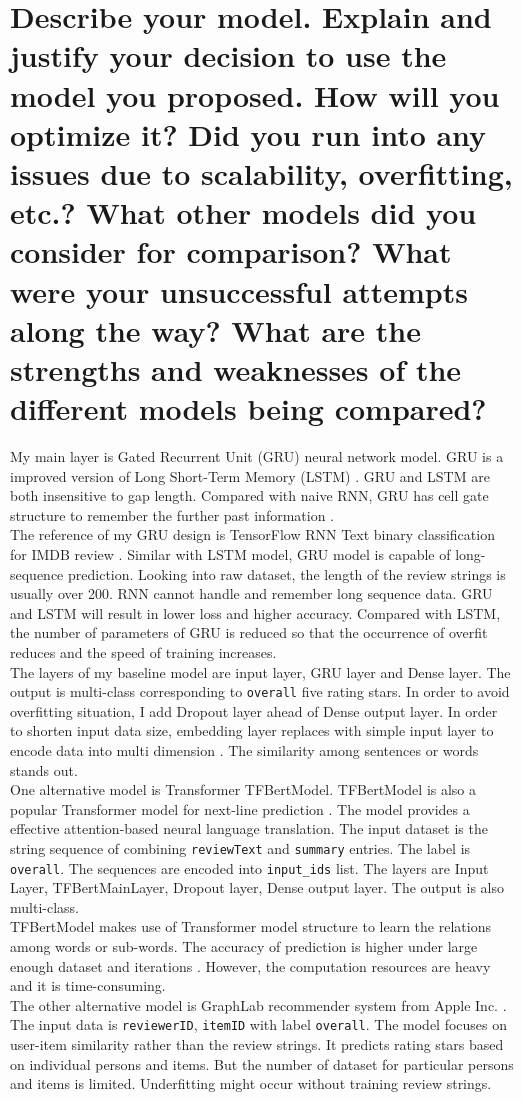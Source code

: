 \documentclass[12pt]{article}
\begin{document}
\section{Describe your model. Explain and justify your decision to use the model you proposed. How
will you optimize it? Did you run into any issues due to scalability, overfitting, etc.? What
other models did you consider for comparison? What were your unsuccessful attempts along
the way? What are the strengths and weaknesses of the different models being compared?} 
My main layer is Gated Recurrent Unit (GRU) neural network model.
GRU is a improved version of Long Short-Term Memory (LSTM) \cite{gru}. GRU and LSTM are both insensitive 
to gap length. Compared with naive RNN, GRU has cell gate structure to remember the further past information \cite{lstm}.\\
The reference of my GRU design is
TensorFlow RNN Text binary classification for IMDB review \cite{Textclassification}. Similar with LSTM model, GRU
model is capable of long-sequence prediction. Looking into raw dataset, the length of the review strings
is usually over 200. RNN cannot handle and remember long sequence data. GRU and LSTM will result in lower loss and 
higher accuracy.
Compared with LSTM, the number of parameters of GRU is reduced so
that the occurrence of overfit reduces and the speed of training increases.\\
The layers of my baseline model are input layer, GRU layer and Dense layer. The output is multi-class corresponding to \texttt{overall} five rating stars. In order to avoid overfitting situation, I add Dropout layer ahead of Dense output layer. In order to shorten input data size, embedding layer replaces with simple input layer to encode data into
multi dimension \cite{emd}. The similarity among sentences or words stands out.\\
One alternative model is Transformer TFBertModel.
TFBertModel is also a popular Transformer model for next-line prediction \cite{BERT, trans}. 
The model provides a effective attention-based neural language translation.
The input dataset is the string
sequence of combining \texttt{reviewText} and \texttt{summary} entries. The label is \texttt{overall}. The sequences are
encoded into \texttt{input\_ids} list. The layers are Input Layer, TFBertMainLayer, Dropout layer, Dense output
layer. The output is also multi-class.\\
TFBertModel makes use of Transformer model structure to learn the relations among words or sub-words.
The accuracy of prediction is higher under large enough dataset and iterations \cite{BERTpros}. 
However, the computation resources are heavy and it is time-consuming.\\
The other alternative model is GraphLab recommender system from Apple Inc. \cite{graph}. 
The input data is \texttt{reviewerID}, \texttt{itemID} with label \texttt{overall}.
The model focuses on user-item similarity rather than the review strings. It predicts rating stars based on individual
persons and items. But the number of dataset for particular persons and items is limited. Underfitting might occur
without training review strings.
\end{document}
